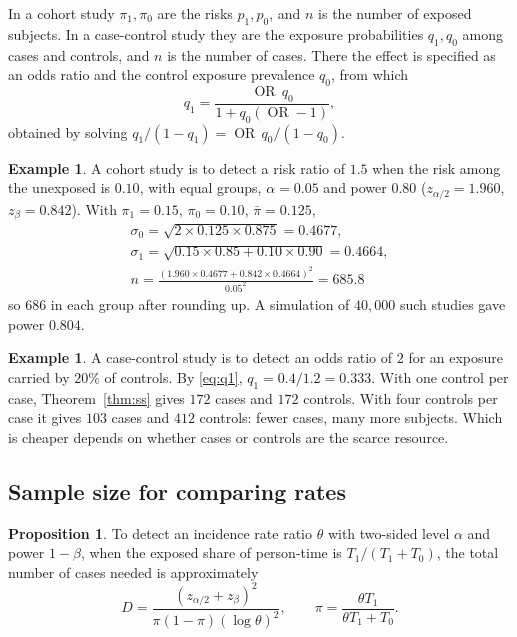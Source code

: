 \documentclass[11pt,a4paper]{article}
\numberwithin{equation}{section}
\DeclareMathOperator{\OR}{OR}
\theoremstyle{definition}
\newtheorem{exa}[thm]{Example}
\newtheorem{prop}[thm]{Proposition}
\begin{document}
In a cohort study $\pi_1, \pi_0$ are the risks $p_1, p_0$, and $n$ is the number of exposed subjects. In a case-control study they are the exposure
probabilities $q_1, q_0$ among cases and controls, and $n$ is the number of cases. There the effect is specified as an odds ratio and the
control exposure prevalence $q_0$, from which
\begin{equation}
\label{eq:q1}
q_1 = \frac{\OR\,q_0}{1 + q_0(\OR - 1)} ,
\end{equation}
obtained by solving $q_1/(1 - q_1) = \OR\,q_0/(1 - q_0)$.

\begin{exa}
\label{exa:sscohort}
A cohort study is to detect a risk ratio of $1.5$ when the risk among the unexposed is $0.10$, with equal groups, $\alpha = 0.05$ and power
$0.80$ ($z_{\alpha/2} = 1.960$, $z_\beta = 0.842$). With $\pi_1 = 0.15$, $\pi_0 = 0.10$, $\bar\pi = 0.125$,
\begin{gather*}
\sigma_0 = \sqrt{2 \times 0.125 \times 0.875} = 0.4677, \\
\sigma_1 = \sqrt{0.15 \times 0.85 + 0.10 \times 0.90} = 0.4664, \\
n = \frac{(1.960 \times 0.4677 + 0.842 \times 0.4664)^2}{0.05^2} = 685.8
\end{gather*}
so $686$ in each group after rounding up. A simulation of $40{,}000$ such studies gave power $0.804$.
\end{exa}

\begin{exa}
\label{exa:sscc}
A case-control study is to detect an odds ratio of $2$ for an exposure carried by $20\%$ of controls. By \eqref{eq:q1},
$q_1 = 0.4/1.2 = 0.333$. With one control per case, Theorem~\ref{thm:ss} gives $172$ cases and $172$ controls. With four controls per case it gives
$103$ cases and $412$ controls: fewer cases, many more subjects. Which is cheaper depends on whether cases or controls are the scarce
resource.
\end{exa}

\subsection{Sample size for comparing rates}

\begin{prop}
\label{prop:ssrates}
To detect an incidence rate ratio $\theta$ with two-sided level $\alpha$ and power $1 - \beta$, when the exposed share of person-time is $T_1/(T_1 + T_0)$, the
total number of cases needed is approximately
\[
D = \frac{(z_{\alpha/2} + z_\beta)^2}{\pi(1 - \pi)(\log\theta)^2}, \qquad \pi = \frac{\theta T_1}{\theta T_1 + T_0} .
\]
\end{prop}
\end{document}
